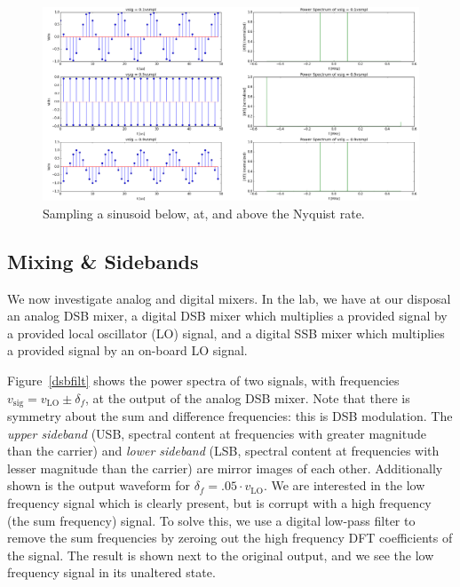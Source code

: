 \documentclass[11pt]{article}
\begin{document}
    \begin{figure}[H]
        \centering
            \includegraphics[width = \textwidth]{1_3_sampling.png}
        \caption{Sampling a sinusoid below, at, and above the Nyquist rate.}
        \label{nyquist}
    \end{figure}


    \subsection{Mixing \& Sidebands}
    We now investigate analog and digital mixers. In the lab, we have at our disposal an analog DSB mixer, a digital DSB mixer which multiplies a provided signal by a provided local oscillator (LO) signal, and a digital SSB mixer which multiplies a provided signal by an on-board LO signal.
    
    \noindent Figure~\ref{dsbfilt} shows the power spectra of two signals, with frequencies $v_{\text{sig}} = v_{\text{LO}} \pm \delta_f$, at the output of the analog DSB mixer. Note that there is symmetry about the sum and difference frequencies: this is DSB modulation. The \emph{upper sideband} (USB, spectral content at frequencies with greater magnitude than the carrier) and \emph{lower sideband} (LSB, spectral content at frequencies with lesser magnitude than the carrier) are mirror images of each other. Additionally shown is the output waveform for $\delta_f = .05\cdot v_{\text{LO}}$. We are interested in the low frequency signal which is clearly present, but is corrupt with a high frequency (the sum frequency) signal. To solve this, we use a digital low-pass filter to remove the sum frequencies by zeroing out the high frequency DFT coefficients of the signal. The result is shown next to the original output, and we see the low frequency signal in its unaltered state.
    
\end{document}
